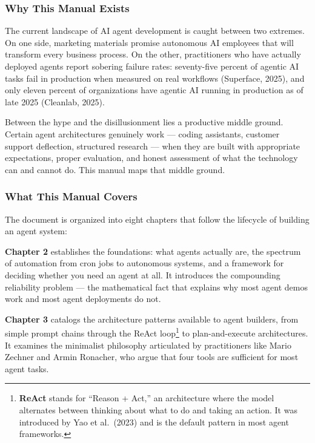 \documentclass[11pt, a4paper]{article}
\begin{document}
\hypertarget{why-this-manual-exists}{%
\subsubsection{Why This Manual Exists}\label{why-this-manual-exists}}

The current landscape of AI agent development is caught between two
extremes. On one side, marketing materials promise autonomous AI
employees that will transform every business process. On the other,
practitioners who have actually deployed agents report sobering failure
rates: seventy-five percent of agentic AI tasks fail in production when
measured on real workflows (Superface, 2025), and only eleven percent of
organizations have agentic AI running in production as of late 2025
(Cleanlab, 2025).

Between the hype and the disillusionment lies a productive middle
ground. Certain agent architectures genuinely work --- coding
assistants, customer support deflection, structured research --- when
they are built with appropriate expectations, proper evaluation, and
honest assessment of what the technology can and cannot do. This manual
maps that middle ground.

\hypertarget{what-this-manual-covers}{%
\subsubsection{What This Manual Covers}\label{what-this-manual-covers}}

The document is organized into eight chapters that follow the lifecycle
of building an agent system:

\textbf{Chapter 2} establishes the foundations: what agents actually
are, the spectrum of automation from cron jobs to autonomous systems,
and a framework for deciding whether you need an agent at all. It
introduces the compounding reliability problem --- the mathematical fact
that explains why most agent demos work and most agent deployments do
not.

\textbf{Chapter 3} catalogs the architecture patterns available to agent
builders, from simple prompt chains through the ReAct loop\footnote{\textbf{ReAct}
  stands for ``Reason + Act,'' an architecture where the model
  alternates between thinking about what to do and taking an action. It
  was introduced by Yao et al.~(2023) and is the default pattern in most
  agent frameworks.} to plan-and-execute architectures. It examines the
minimalist philosophy articulated by practitioners like Mario Zechner
and Armin Ronacher, who argue that four tools are sufficient for most
agent tasks.
\end{document}
